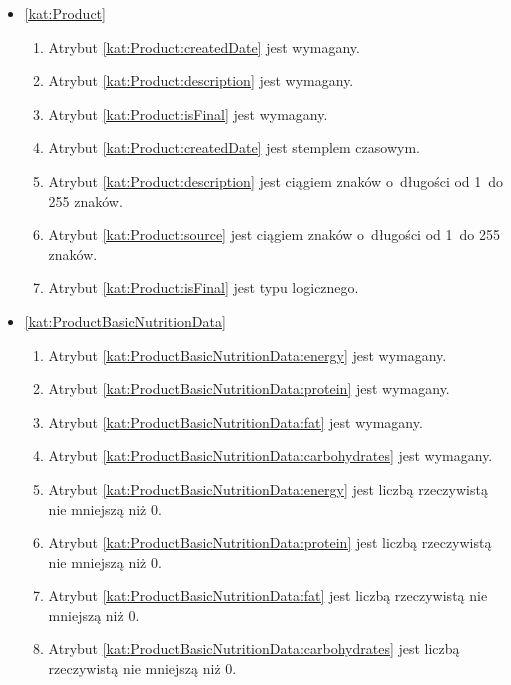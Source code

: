 \begin{itemize}[label={\textbf{Ograniczenia dla}}, wide, labelwidth=!, labelindent=0pt]
    \setlength\itemsep{1.75em}
    \item\ref{kat:Product}\mynobreakpar
    \begin{enumerate}[label={\textbf{OGR/2/\protect\twodigits{\arabic{enumi}}}}, wide, labelwidth=!, align=left, leftmargin=3cm]
        \item Atrybut \ref{kat:Product:createdDate} jest wymagany.
        \item Atrybut \ref{kat:Product:description} jest wymagany.
        \item Atrybut \ref{kat:Product:isFinal} jest wymagany.

        \item Atrybut \ref{kat:Product:createdDate} jest stemplem czasowym.
        \item Atrybut \ref{kat:Product:description} jest ciągiem znaków o~długości od 1~do 255 znaków.
        \item Atrybut \ref{kat:Product:source} jest ciągiem znaków o~długości od 1~do 255 znaków.
        \item Atrybut \ref{kat:Product:isFinal} jest typu logicznego.
    \end{enumerate}

    \item\ref{kat:ProductBasicNutritionData}\mynobreakpar
    \begin{enumerate}[label={\textbf{OGR/2/\protect\twodigits{\arabic{enumi}}}}, wide, labelwidth=!, align=left, leftmargin=3cm, resume]
        \item Atrybut \ref{kat:ProductBasicNutritionData:energy} jest wymagany.
        \item Atrybut \ref{kat:ProductBasicNutritionData:protein} jest wymagany.
        \item Atrybut \ref{kat:ProductBasicNutritionData:fat} jest wymagany.
        \item Atrybut \ref{kat:ProductBasicNutritionData:carbohydrates} jest wymagany.

        \item Atrybut \ref{kat:ProductBasicNutritionData:energy} jest liczbą rzeczywistą nie mniejszą niż 0.
        \item Atrybut \ref{kat:ProductBasicNutritionData:protein} jest liczbą rzeczywistą nie mniejszą niż 0.
        \item Atrybut \ref{kat:ProductBasicNutritionData:fat} jest liczbą rzeczywistą nie mniejszą niż 0.
        \item Atrybut \ref{kat:ProductBasicNutritionData:carbohydrates} jest liczbą rzeczywistą nie mniejszą niż 0.
    \end{enumerate}


\end{itemize}
